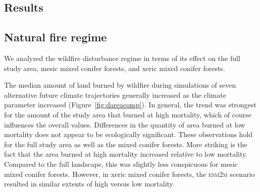 \documentclass[12pt]{article}
\begin{document}
\begin{spacing}{1}
\section{Results}

\subsection*{Natural fire regime}

We analyzed the wildfire disturbance regime in terms of its effect on the full study area, mesic mixed conifer forests, and xeric mixed conifer forests. 

The median amount of land burned by wildfire during simulations of seven alternative future climate trajectories generally increased as the climate parameter increased (Figure~\ref{fig:dareacomp}). In general, the trend was strongest for the amount of the study area that burned at high mortality, which of course influences the overall values. Differences in the quantity of area burned at low mortality does not appear to be ecologically significant. These observations hold for the full study area as well as the mixed conifer forests. More striking is the fact that the area burned at high mortality increased relative to low mortality. Compared to the full landscape, this was slightly less conspicuous for mesic mixed conifer forests. However, in xeric mixed conifer forests, the \textsc{esm2m} scenario resulted in similar extents of high versus low mortality. 


\begin{figure}[!htbp]
  \centering


\end{figure}
\end{spacing}
\end{document}
